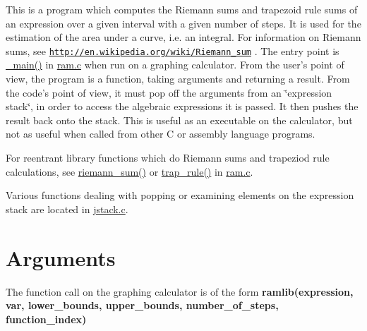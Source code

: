 This is a program which computes the Riemann sums and trapezoid rule sums of an expression over a given interval with a given number of steps. It is used for the estimation of the area under a curve, i.e. an integral. For information on Riemann sums, see \href{http://en.wikipedia.org/wiki/Riemann_sum}{\tt http://en.wikipedia.org/wiki/Riemann\_\-sum} . The entry point is \hyperlink{ram_8c_aa212f497d0e60a46a30582320c2fefef}{\_\-main()} in \hyperlink{ram_8c}{ram.c} when run on a graphing calculator. From the user's point of view, the program is a function, taking arguments and returning a result. From the code's point of view, it must pop off the arguments from an \char`\"{}expression stack\char`\"{}, in order to access the algebraic expressions it is passed. It then pushes the result back onto the stack. This is useful as an executable on the calculator, but not as useful when called from other C or assembly language programs.

For reentrant library functions which do Riemann sums and trapeziod rule calculations, see \hyperlink{ram_8c_a549bc93c3536bde8ffbcca9bb5035fda}{riemann\_\-sum()} or \hyperlink{ram_8c_a0415ba140e87ce3dca1acc1017f36fc7}{trap\_\-rule()} in \hyperlink{ram_8c}{ram.c}.

Various functions dealing with popping or examining elements on the expression stack are located in \hyperlink{jstack_8c}{jstack.c}.\hypertarget{index_Arguments}{}\section{Arguments}\label{index_Arguments}
The function call on the graphing calculator is of the form {\bfseries  ramlib(expression, var, lower\_\-bounds, upper\_\-bounds, number\_\-of\_\-steps, function\_\-index) }

